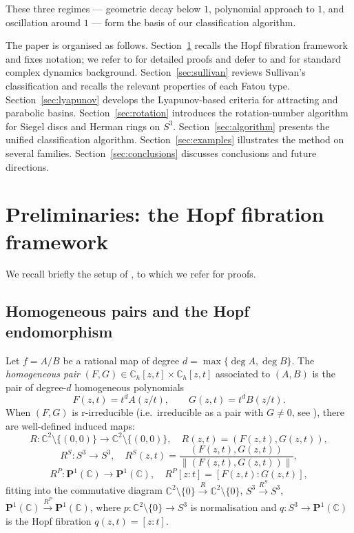 \documentclass[12pt]{article}
\theoremstyle{definition}
\newcommand{\C}{\mathbb{C}}
\newcommand{\Pone}{\mathbf{P}^1(\C)}
\newcommand{\Sthree}{S^3}
\newcommand{\RS}{R^S}
\newcommand{\RP}{R^P}
\begin{document}
These three regimes --- geometric decay below $1$, polynomial approach
to $1$, and oscillation around $1$ --- form the basis of our classification
algorithm.

The paper is organised as follows.  Section~\ref{sec:prelim} recalls the
Hopf fibration framework and fixes notation; we refer to \cite{Alvarez2023}
for detailed proofs and defer to \cite{Milnor2006} and \cite{Beardon1991}
for standard complex dynamics background.  Section~\ref{sec:sullivan}
reviews Sullivan's classification and recalls the relevant properties of
each Fatou type.  Section~\ref{sec:lyapunov} develops the Lyapunov-based
criteria for attracting and parabolic basins.  Section~\ref{sec:rotation}
introduces the rotation-number algorithm for Siegel discs and Herman rings
on $S^3$.  Section~\ref{sec:algorithm} presents the unified classification
algorithm.  Section~\ref{sec:examples} illustrates the method on several
families.  Section~\ref{sec:conclusions} discusses conclusions and future
directions.

\section{Preliminaries: the Hopf fibration framework}
\label{sec:prelim}

We recall briefly the setup of \cite{Alvarez2023}, to which we refer for
proofs.

\subsection{Homogeneous pairs and the Hopf endomorphism}

Let $f = A/B$ be a rational map of degree $d = \max\{\deg A, \deg B\}$.
The \emph{homogeneous pair} $(F,G) \in \C_h[z,t]\times\C_h[z,t]$
associated to $(A,B)$ is the pair of degree-$d$ homogeneous polynomials
\[
  F(z,t) = t^d A(z/t), \qquad G(z,t) = t^d B(z/t).
\]
When $(F,G)$ is r-irreducible (i.e.~irreducible as a pair with $G \ne 0$,
see \cite[Def.~12]{Alvarez2023}), there are well-defined induced maps:
\[
  R:\C^2\setminus\{(0,0)\}\to\C^2\setminus\{(0,0)\},\quad
  R(z,t) = (F(z,t),G(z,t)),
\]
\[
  \RS:\Sthree\to\Sthree,\quad
  \RS(z,t) = \frac{(F(z,t),G(z,t))}{\|(F(z,t),G(z,t))\|},
\]
\[
  \RP:\Pone\to\Pone,\quad \RP[z:t]=[F(z,t):G(z,t)],
\]
fitting into the commutative diagram
$\C^2\setminus\{0\}\xrightarrow{R}\C^2\setminus\{0\}$,
$\Sthree\xrightarrow{\RS}\Sthree$, $\Pone\xrightarrow{\RP}\Pone$,
where $p:\C^2\setminus\{0\}\to\Sthree$ is normalisation and
$q:\Sthree\to\Pone$ is the Hopf fibration $q(z,t) = [z:t]$.
\end{document}
